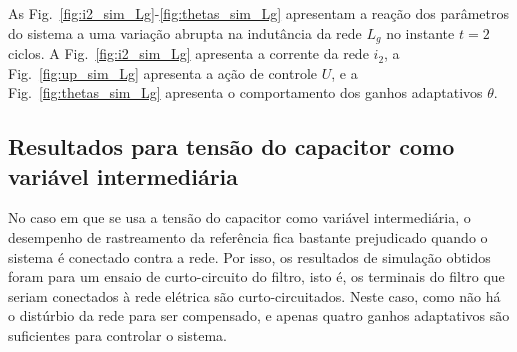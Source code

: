   As Fig.~\ref{fig:i2_sim_Lg}-\ref{fig:thetas_sim_Lg} apresentam a reação dos parâmetros do sistema a uma variação abrupta na indutância da rede $L_g$ no instante $t=2$ ciclos. A Fig.~\ref{fig:i2_sim_Lg} apresenta a corrente da rede $i_2$, a Fig.~\ref{fig:up_sim_Lg} apresenta a ação de controle $U$, e a Fig.~\ref{fig:thetas_sim_Lg} apresenta o comportamento dos ganhos adaptativos $\theta$.

  \vfill
  \noindent
  \begin{minipage}{\textwidth}
    \makebox[\textwidth]{
      \centering
      \def\svgwidth{\textwidth}
      }
    \label{fig:i2_sim_Lg}
  \end{minipage}
  \vfill

  \newpage

  \vfill
  \noindent
  \begin{minipage}{0.9\textwidth}
    \makebox[\textwidth]{
      \centering
      \def\svgwidth{\textwidth}
      }
    \label{fig:up_sim_Lg}
  \end{minipage}

  \vfill
  \noindent
  \begin{minipage}{0.9\textwidth}
    \makebox[\textwidth]{
      \centering
      \def\svgwidth{\textwidth}
      }
    \label{fig:thetas_sim_Lg}
  \end{minipage}

  \vfill

  \newpage

  \subsection{Resultados para tensão do capacitor como variável intermediária}

  No caso em que se usa a tensão do capacitor como variável intermediária, o desempenho de rastreamento da referência fica bastante prejudicado quando o sistema é conectado contra a rede. Por isso, os resultados de simulação obtidos foram para um ensaio de curto-circuito do filtro, isto é, os terminais do filtro que seriam conectados à rede elétrica são curto-circuitados. Neste caso, como não há o distúrbio da rede para ser compensado, e apenas quatro ganhos adaptativos são suficientes para controlar o sistema.

